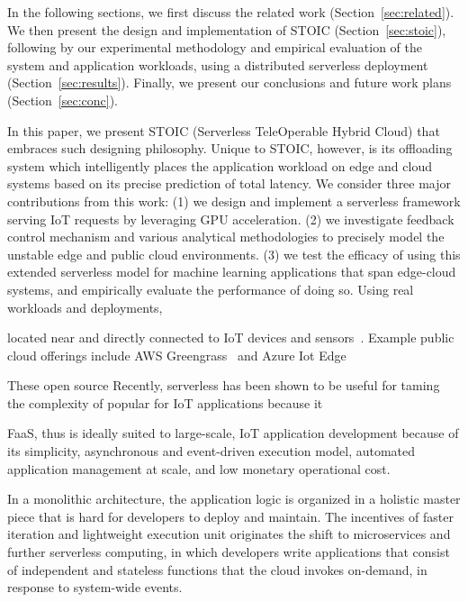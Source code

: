 In the following sections, we first discuss the related work (Section~\ref{sec:related}). We then present the design and implementation of STOIC (Section~\ref{sec:stoic}), following by our experimental methodology and empirical evaluation of the system and application workloads, using a distributed serverless deployment (Section~\ref{sec:results}). Finally, we present our conclusions and future work plans (Section~\ref{sec:conc}).









\iffalse
In this paper, we present STOIC (Serverless TeleOperable Hybrid Cloud) that embraces such designing philosophy. Unique to STOIC, however, is its offloading system which intelligently places the application workload on edge and cloud systems based on its precise prediction of total latency. We consider three major contributions from this work: (1) we design and implement a serverless framework serving IoT requests by leveraging GPU acceleration. (2) we investigate feedback control mechanism and various analytical methodologies to precisely model the unstable edge and public cloud environments. (3) we test the efficacy of using this extended serverless model for machine learning applications that span edge-cloud systems, and empirically evaluate the performance of doing so. Using real workloads and deployments, 

located near and directly
connected to IoT devices and
sensors~\cite{edge,bonomi2012fog,cloudlets,cloudlets2012satya,verbelen2012cloudlets}.
Example public cloud offerings include AWS Greengrass~\cite{greengrassweb,awsiot-web} and
Azure Iot Edge~\cite{iotedge-web,iothub-web}


These open source Recently, serverless has been shown to be useful for taming the complexity of  popular for IoT applications because it 

FaaS, thus is ideally suited to large-scale, IoT application development because of its simplicity,
asynchronous and event-driven execution model, automated application management at scale,
and low monetary operational cost.

In a monolithic architecture, the application logic is organized in a holistic master piece that is hard for developers to deploy and maintain. The incentives of faster iteration and lightweight execution unit originates the shift to microservices and further serverless computing, in which developers write applications that consist of independent and stateless functions that the cloud invokes on-demand, in response to system-wide events.

